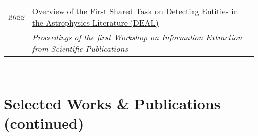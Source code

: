 \documentclass[a4paper,10pt]{article}
\begin{document}
\begin{tabular}{rp{15.5cm}}
        \emph{2022} & \href{https://scixplorer.org/abs/2022wies.conf....1G/abstract}{Overview of the First Shared Task on Detecting Entities in the Astrophysics Literature (DEAL)}\\
        & \small{{\em Proceedings of the first Workshop on Information Extraction from Scientific Publications}}
        \vspace{0.15cm} \\
        
    \end{tabular}\\

\section{Selected Works \& Publications (continued)}
    \vspace{0.2cm} 
\end{document}
